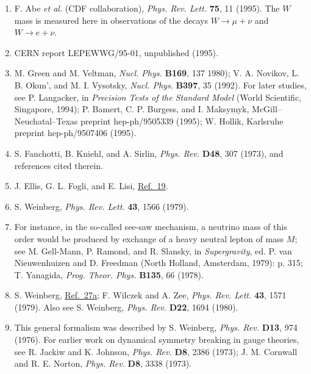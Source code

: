 \begin{enumerate}
\item {}\label{ch21-ref-23}
F. Abe \emph{et al.} (CDF collaboration), \emph{Phys. Rev. Lett.}
\textbf{75}, 11 (1995). The $W$ mass is measured here in observations of
the decays $W\to\mu+\nu$ and $W\to e+\nu$.

\item {}\label{ch21-ref-24}
CERN report LEPEWWG/95-01, unpublished (1995).

\item {}\label{ch21-ref-25}
M. Green and M. Veltman, \emph{Nucl. Phys.} \textbf{B169}, 137 1980);
V. A. Novikov, L. B. Okun', and M. I. Vysotsky, \emph{Nucl. Phys.}
\textbf{B397}, 35 (1992). For later studies, see P. Langacker, in
\emph{Precision Tests of the Standard Model} (World Scientific, Singapore,
1994); P. Bamert, C. P. Burgess, and I. Maksymyk,
McGill--Neuchatal--Texas preprint hep-ph/9505339 (1995); W. Hollik,
Karlsruhe preprint hep-ph/9507406 (1995).

\item {}\label{ch21-ref-26}
S. Fanchotti, B. Kniehl, and A. Sirlin, \emph{Phys. Rev.} \textbf{D48},
307 (1973), and references cited therein.

\item {}\label{ch21-ref-27}
J. Ellis, G. L. Fogli, and E. Lisi, \hyperref[ch21-ref-19]{Ref.~19}.

\item[27a.] \label{ch21-ref-27a}
S. Weinberg, \emph{Phys. Rev. Lett.} \textbf{43}, 1566 (1979).

\item[27b.] \label{ch21-ref-27b}
For instance, in the so-called see-saw mechanism, a neutrino mass of this
order would be produced by exchange of a heavy neutral lepton of mass $M$;
see M. Gell-Mann, P. Ramond, and R. Slansky, in \emph{Supergravity},
ed. P. van Nieuwenhuizen and D. Freedman (North Holland, Amsterdam, 1979):
p. 315; T. Yanagida, \emph{Prog. Theor. Phys.} \textbf{B135}, 66 (1978).

\item[27c.] \label{ch21-ref-27c}
S. Weinberg, \hyperref[ch21-ref-27a]{Ref.~27a}; F. Wilczek and A. Zee,
\emph{Phys. Rev. Lett.} \textbf{43}, 1571 (1979). Also see S. Weinberg,
\emph{Phys. Rev.} \textbf{D22}, 1694 (1980).

\item {}\label{ch21-ref-28}
This general formalism was described by S. Weinberg, \emph{Phys. Rev.}
\textbf{D13}, 974 (1976). For earlier work on dynamical symmetry breaking
in gauge theories, see R. Jackiw and K. Johnson, \emph{Phys. Rev.}
\textbf{D8}, 2386 (1973); J. M. Cornwall and R. E. Norton,
\emph{Phys. Rev.} \textbf{D8}, 3338 (1973).


\end{enumerate}
